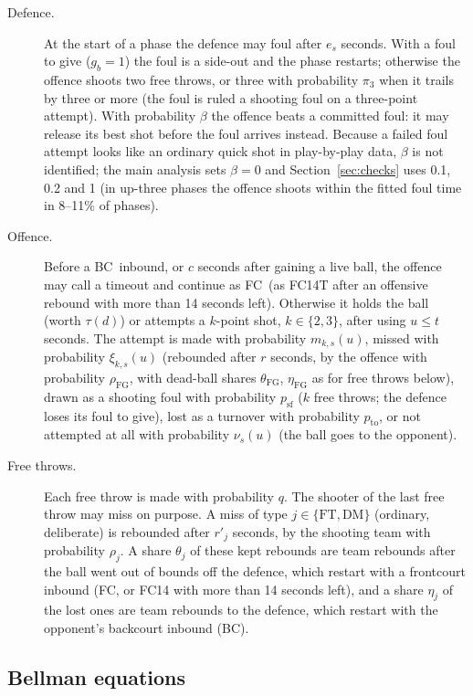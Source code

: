 \documentclass[article]{jdssv}
\newcommand{\BC}{\textsf{BC}}
\newcommand{\FC}{\textsf{FC}}
\begin{document}
\begin{description}
\item[Defence.] At the start of a phase the defence may foul after $e_s$ seconds. With a foul to give
($g_b=1$) the foul is a side-out and the phase restarts; otherwise the offence shoots two free throws, or
three with probability $\pi_3$ when it trails by three or more
(the foul is ruled a shooting foul on a three-point attempt). With probability $\beta$ the offence beats a committed
foul: it may release its best shot before the foul arrives instead. Because a failed foul attempt looks like an
ordinary quick shot in play-by-play data, $\beta$ is not identified; the main analysis sets $\beta=0$ and
Section~\ref{sec:checks} uses 0.1, 0.2 and 1 (in up-three phases the offence shoots within the fitted foul time in
8--11\% of phases).
\item[Offence.] Before a \BC\ inbound, or $c$ seconds after gaining a live ball, the offence may call a
timeout and continue as \FC\ (as \textsf{FC14T} after an offensive rebound with more than 14 seconds left). Otherwise it holds the ball (worth $\tau(d)$) or attempts a $k$-point shot,
$k\in\{2,3\}$, after using $u\le t$ seconds. The attempt is made with probability $m_{k,s}(u)$, missed with
probability $\xi_{k,s}(u)$ (rebounded after $r$ seconds, by the offence with probability $\rho_{\mathrm{FG}}$, with
dead-ball shares $\theta_{\mathrm{FG}}$, $\eta_{\mathrm{FG}}$ as for free throws below),
drawn as a shooting foul with probability $p_{\mathrm{sf}}$ ($k$ free throws; the defence loses its foul to
give), lost as a turnover with probability $p_{\mathrm{to}}$, or not attempted at all with probability
$\nu_s(u)$ (the ball goes to the opponent).
\item[Free throws.] Each free throw is made with probability $q$. The shooter of the last free throw may miss
on purpose. A miss of type $j\in\{\mathrm{FT},\mathrm{DM}\}$ (ordinary, deliberate) is rebounded after $r'_j$ seconds, by the
shooting team with probability $\rho_j$. A share $\theta_j$ of these kept rebounds are team rebounds after the ball went
out of bounds off the defence, which restart with a frontcourt inbound (\FC, or \textsf{FC14} with more than 14
seconds left), and a share $\eta_j$ of the lost ones are team rebounds to the defence, which restart with the
opponent's backcourt inbound (\BC).
\end{description}

\subsection{Bellman equations}
\end{document}
